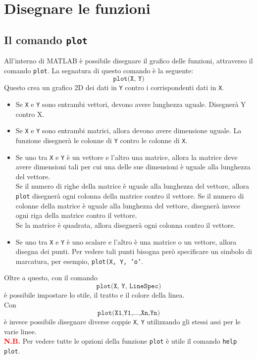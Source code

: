 \chapter{Disegnare le funzioni}
\section{Il comando \texttt{plot}}
All'interno di MATLAB è possibile disegnare il grafico delle funzioni, attraverso il comando \texttt{plot}.
La segnatura di questo comando è la seguente:
$$ \texttt{plot(X, Y)} $$
Questo crea un grafico 2D dei dati in \texttt{Y} contro i corrispondenti dati in \texttt{X}.
\begin{itemize}
	\item 	Se \texttt{X} e \texttt{Y} sono entrambi vettori, devono avere lunghezza uguale. Disegnerà Y contro X.
	\item	Se \texttt{X} e \texttt{Y} sono entrambi matrici, allora devono avere dimensione uguale. La funzione
			disegnerà le colonne di \texttt{Y} contro le colonne di \texttt{X}.
	\item	Se uno tra \texttt{X} e \texttt{Y} è un vettore e l'altro una matrice, allora la matrice deve avere
			dimensioni tali per cui una delle sue dimensioni è uguale alla lunghezza del vettore. \\
			Se il numero di righe della matrice è uguale alla lunghezza del vettore, allora \texttt{plot} 
			disegnerà ogni colonna della matrice contro il vettore. Se il numero di colonne della matrice è uguale
			alla lunghezza del vettore, disegnerà invece ogni riga della matrice contro il vettore. \\
			Se la matrice è quadrata, allora disegnerà ogni colonna contro il vettore.
	\item	Se uno tra \texttt{X} e \texttt{Y} è uno scalare e l'altro è una matrice o un vettore, allora disegna
			dei punti. Per vedere tali punti bisogna però specificare un simbolo di marcatura, per esempio,
			\texttt{plot(X, Y, 'o'}.
\end{itemize}

Oltre a questo, con il comando $$\texttt{plot(X, Y, LineSpec)}$$ è possibile impostare lo stile, il tratto e il 
colore della linea. \break \\
Con $$\texttt{plot(X1,Y1,...,Xn,Yn)}$$ è invece possibile disegnare diverse coppie \texttt{X}, \texttt{Y} utilizzando 
gli stessi assi per le varie linee. \break \\

\textcolor{Red}{\textbf{N.B.}} Per vedere tutte le opzioni della funzione \texttt{plot} è utile il comando \texttt{help 
plot}.